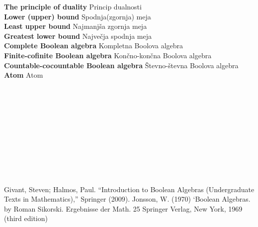 \documentclass{amsart}
\newcommand{\geslo}[2]{\noindent\textbf{#1} \quad \hangindent=1cm #2\\[-1pc]}
\begin{document}
\geslo{The principle of duality}{Princip dualnosti}

\geslo{Lower (upper) bound}{Spodnja(zgornja) meja}

\geslo{Least upper bound}{Najmanjša zgornja meja}

\geslo{Greatest lower bound}{Največja spodnja meja}

\geslo{Complete Boolean algebra}{Kompletna Boolova algebra}

\geslo{Finite-cofinite Boolean algebra}{Končno-končna Boolova algebra}

\geslo{Countable-cocountable Boolean algebra}{Števno-števna Boolova algebra}

\geslo{Atom}{Atom}

\geslo{}{}

\geslo{}{}

\geslo{}{}

\geslo{}{}

\geslo{}{}

\geslo{}{}

\geslo{}{}

\geslo{}{}

\geslo{}{}


\geslo{}{}






\begin{thebibliography}{1}
Givant, Steven; Halmos, Paul. ``Introduction to Boolean Algebras (Undergraduate Texts in Mathematics),'' Springer (2009).
Jonsson, W. (1970) ‘Boolean Algebras. by Roman Sikorski. Ergebnisse der Math. 25 Springer Verlag, New York, 1969 (third edition)
\end{thebibliography}
\end{document}
